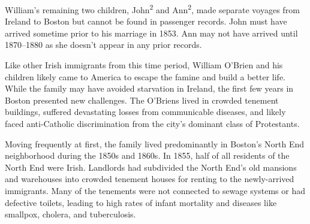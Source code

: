 William's remaining two children, John\textsuperscript{2} and Ann\textsuperscript{2}, made separate voyages from Ireland to Boston but cannot be found in passenger records. John must have arrived sometime prior to his marriage in 1853.\cite{John2OBrienCivilMarriage} Ann may not have arrived until 1870--1880 as she doesn't appear in any prior records.\cite{Census1880Edward} 

Like other Irish immigrants from this time period, William O'Brien and his children likely came to America to escape the famine and build a better life. While the family may have avoided starvation in Ireland, the first few years in Boston presented new challenges. The O'Briens lived in crowded tenement buildings, suffered devastating losses from communicable diseases, and likely faced anti-Catholic discrimination from the city's dominant class of Protestants.\cite{Ryan:61,Quinlan:58}
	
Moving frequently at first, the family lived predominantly in Boston's North End neighborhood during the 1850s and 1860s.\cite{NorthEndAddresses} In 1855, half of all residents of the North End were Irish.\cite{Todisco:29} Landlords had subdivided the North End's old mansions and warehouses into crowded tenement houses for renting to the newly-arrived immigrants.\cite{Goldfeld:102} Many of the tenements were not connected to sewage systems or had defective toilets, leading to high rates of infant mortality and diseases like smallpox, cholera, and tuberculosis.\cite{Goldfeld:103,Todisco:21,Ryan:48}


